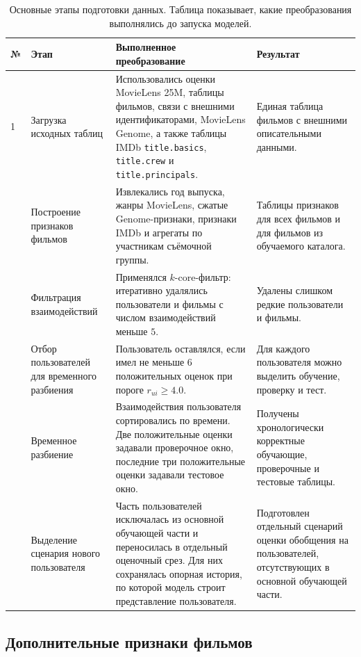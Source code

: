 \documentclass[12pt,fleqn]{article}
\begin{document}
\begin{table}[H]
\centering
\footnotesize
\renewcommand{\arraystretch}{1.20}
\caption{Основные этапы подготовки данных. Таблица показывает, какие преобразования выполнялись до запуска моделей.}
\label{tab:appendix_preprocessing_pipeline}
\begin{tabular}{p{}p{}p{}p{}}
\toprule
№ & Этап & Выполненное преобразование & Результат \\
\midrule
1 & Загрузка исходных таблиц & Использовались оценки MovieLens 25M, таблицы фильмов, связи с внешними идентификаторами, MovieLens Genome, а также таблицы IMDb \texttt{title.basics}, \texttt{title.crew} и \texttt{title.principals}. & Единая таблица фильмов с внешними описательными данными. \\
\addlinespace
2 & Построение признаков фильмов & Извлекались год выпуска, жанры MovieLens, сжатые Genome-признаки, признаки IMDb и агрегаты по участникам съёмочной группы. & Таблицы признаков для всех фильмов и для фильмов из обучаемого каталога. \\
\addlinespace
3 & Фильтрация взаимодействий & Применялся $k$-core-фильтр: итеративно удалялись пользователи и фильмы с числом взаимодействий меньше $5$. & Удалены слишком редкие пользователи и фильмы. \\
\addlinespace
4 & Отбор пользователей для временного разбиения & Пользователь оставлялся, если имел не меньше $6$ положительных оценок при пороге $r_{ui}\ge 4.0$. & Для каждого пользователя можно выделить обучение, проверку и тест. \\
\addlinespace
5 & Временное разбиение & Взаимодействия пользователя сортировались по времени. Две положительные оценки задавали проверочное окно, последние три положительные оценки задавали тестовое окно. & Получены хронологически корректные обучающие, проверочные и тестовые таблицы. \\
\addlinespace
6 & Выделение сценария нового пользователя & Часть пользователей исключалась из основной обучающей части и переносилась в отдельный оценочный срез. Для них сохранялась опорная история, по которой модель строит представление пользователя. & Подготовлен отдельный сценарий оценки обобщения на пользователей, отсутствующих в основной обучающей части. \\
\bottomrule
\end{tabular}
\end{table}



\subsection{Дополнительные признаки фильмов}
\end{document}
